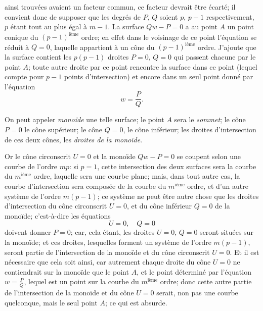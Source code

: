 \documentclass[11pt,a4paper]{article}
\begin{document}
\clearpage

ainsi trouv\'{e}es avaient un facteur commun, ce facteur devrait \^{e}tre \'{e}cart\'{e}; il convient donc de supposer que les degr\'{e}s de $P$, $Q$ soient $p$, $p-1$ respectivement, $p$ \'{e}tant tout au plus \'{e}gal \`{a} $m-1$. La surface $Qw - P = 0$ a au point $A$ un point conique du $(p-1)^{\text{i\`{e}me}}$ ordre; en effet dans le voisinage de ce point l'\'{e}quation se r\'{e}duit \`{a} $Q = 0$, laquelle appartient \`{a} un c\^{o}ne du $(p-1)^{\text{i\`{e}me}}$ ordre. J'ajoute que la surface contient les $p(p-1)$ droites $P = 0$, $Q = 0$ qui passent chacune par le point $A$; toute autre droite par ce point rencontre la surface dans ce point (lequel compte pour $p-1$ points d'intersection) et encore dans un seul point donn\'{e} par l'\'{e}quation
\[
w = \frac{P}{Q}.
\]

On peut appeler \textit{mono\"{i}de} une telle surface; le point $A$ sera le \textit{sommet}; le c\^{o}ne $P = 0$ le c\^{o}ne sup\'{e}rieur; le c\^{o}ne $Q = 0$, le c\^{o}ne inf\'{e}rieur; les droites d'intersection de ces deux c\^{o}nes, les \textit{droites de la mono\"{i}de}.

Or le c\^{o}ne circonscrit $U = 0$ et la mono\"{i}de $Qw - P = 0$ se coupent selon une courbe de l'ordre $mp$: si $p = 1$, cette intersection des deux surfaces sera la courbe du $m^{\text{i\`{e}me}}$ ordre, laquelle sera une courbe plane; mais, dans tout autre cas, la courbe d'intersection sera compos\'{e}e de la courbe du $m^{\text{i\`{e}me}}$ ordre, et d'un autre syst\`{e}me de l'ordre $m(p-1)$; ce syst\`{e}me ne peut \^{e}tre autre chose que les droites d'intersection du c\^{o}ne circonscrit $U = 0$, et du c\^{o}ne inf\'{e}rieur $Q = 0$ de la mono\"{i}de; c'est-\`{a}-dire les \'{e}quations
\[
U = 0, \quad Q = 0
\]
doivent donner $P = 0$; car, cela \'{e}tant, les droites $U = 0$, $Q = 0$ seront situ\'{e}es sur la mono\"{i}de; et ces droites, lesquelles forment un syst\`{e}me de l'ordre $m(p-1)$, seront partie de l'intersection de la mono\"{i}de et du c\^{o}ne circonscrit $U = 0$. Et il est n\'{e}cessaire que cela soit ainsi, car autrement chaque droite du c\^{o}ne $U = 0$ ne contiendrait sur la mono\"{i}de que le point $A$, et le point d\'{e}termin\'{e} par l'\'{e}quation $w = \frac{P}{Q}$, lequel est un point sur la courbe du $m^{\text{i\`{e}me}}$ ordre; donc cette autre partie de l'intersection de la mono\"{i}de et du c\^{o}ne $U = 0$ serait, non pas une courbe quelconque, mais le seul point $A$; ce qui est absurde.
\end{document}
